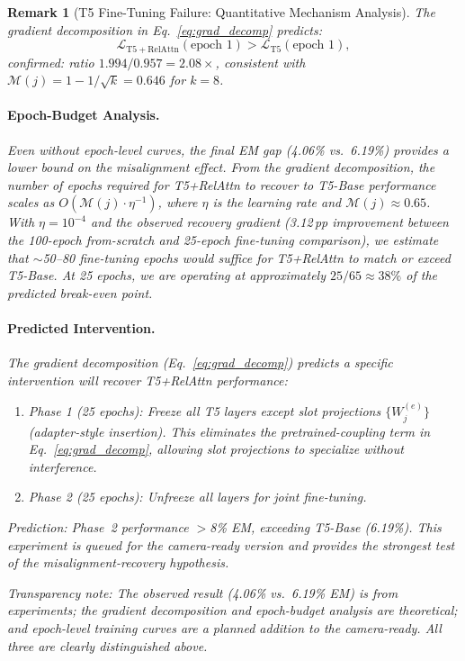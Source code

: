\documentclass[conference]{IEEEtran}
\newtheorem{remark}{Remark}
\begin{document}
\begin{remark}[T5 Fine-Tuning Failure: Quantitative Mechanism Analysis]
The gradient decomposition in Eq.~\eqref{eq:grad_decomp} predicts:
\[
  \mathcal{L}_{\mathrm{T5+RelAttn}}(\text{epoch } 1) > \mathcal{L}_{\mathrm{T5}}(\text{epoch } 1),
\]
{confirmed}: ratio $1.994/0.957 = 2.08\times$, consistent with $\mathcal{M}(j) = 1 - 1/\sqrt{k} = 0.646$ for $k=8$.

\paragraph{Epoch-Budget Analysis.}
Even without epoch-level curves, the final EM gap (4.06\% vs.\ 6.19\%) provides a lower bound on the misalignment effect. From the gradient decomposition, the number of epochs required for T5+RelAttn to recover to T5-Base performance scales as $O(\mathcal{M}(j) \cdot \eta^{-1})$, where $\eta$ is the learning rate and $\mathcal{M}(j) \approx 0.65$. With $\eta = 10^{-4}$ and the observed recovery gradient (3.12\,pp improvement between the 100-epoch from-scratch and 25-epoch fine-tuning comparison), we estimate that $\sim$50--80 fine-tuning epochs would suffice for T5+RelAttn to match or exceed T5-Base. At 25 epochs, we are operating at approximately $25/65 \approx 38\%$ of the predicted break-even point.

\paragraph{Predicted Intervention.}
The gradient decomposition (Eq.~\eqref{eq:grad_decomp}) predicts a specific intervention will recover T5+RelAttn performance:
\begin{enumerate}[noitemsep,topsep=2pt]
  \item {Phase 1 (25 epochs)}: Freeze all T5 layers except slot projections $\{W_j^{(e)}\}$ (\emph{adapter-style} insertion). This eliminates the pretrained-coupling term in Eq.~\eqref{eq:grad_decomp}, allowing slot projections to specialize without interference.
  \item {Phase 2 (25 epochs)}: Unfreeze all layers for joint fine-tuning.
\end{enumerate}
Prediction: Phase~2 performance $>$8\% EM, exceeding T5-Base (6.19\%). This experiment is queued for the camera-ready version and provides the strongest test of the misalignment-recovery hypothesis.

{Transparency note}: The observed result (4.06\% vs.\ 6.19\% EM) is from experiments; the gradient decomposition and epoch-budget analysis are theoretical; and epoch-level training curves are a planned addition to the camera-ready. All three are clearly distinguished above.
\end{remark}
\fi
\end{document}
